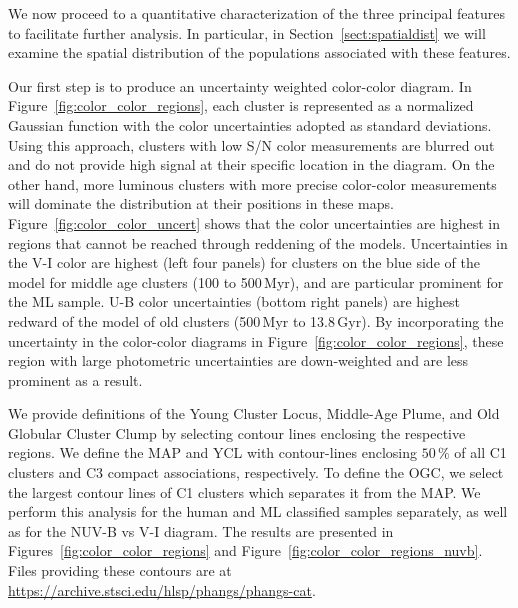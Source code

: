 \documentclass[]{aastex631}
\begin{document}
We now proceed to a quantitative characterization of the three principal features to facilitate further analysis. In particular, in Section~\ref{sect:spatialdist} we will examine the spatial distribution of the populations associated with these features. 

Our first step is to produce an uncertainty weighted color-color diagram. In Figure~\ref{fig:color_color_regions}, each cluster is represented as a normalized Gaussian function with the color uncertainties adopted as standard deviations. Using this approach, clusters with low S/N color measurements are blurred out and do not provide high signal at their specific location in the diagram. On the other hand, more luminous clusters with more precise color-color measurements will dominate the distribution at their positions in these maps.  Figure~\ref{fig:color_color_uncert} shows that the color uncertainties are highest in regions that cannot be reached through reddening of the  models.
Uncertainties in the V-I color are highest (left four panels) for clusters on the blue side of the  model for middle age clusters (100 to 500\,Myr), and are particular prominent for the ML sample.   U-B color uncertainties (bottom right panels) are highest redward of the  model of old clusters (500\,Myr to 13.8\,Gyr). 
By incorporating the uncertainty in the color-color diagrams in Figure~\ref{fig:color_color_regions}, these region with large photometric uncertainties are down-weighted and are less prominent as a result.  

We provide definitions of the Young Cluster Locus, Middle-Age Plume, and Old Globular Cluster Clump by selecting contour lines enclosing the respective regions.
We define the MAP and YCL with contour-lines enclosing $50\,\%$ of all C1 clusters and C3 compact associations, respectively. 
To define the OGC, we select the largest contour lines of C1 clusters which separates it from the MAP. We perform this analysis for the human and ML classified samples separately, as well as for the NUV-B vs V-I diagram.  The results are presented in  Figures~\ref{fig:color_color_regions} and Figure~\ref{fig:color_color_regions_nuvb}. Files providing these contours are at \url{https://archive.stsci.edu/hlsp/phangs/phangs-cat}.
\end{document}
